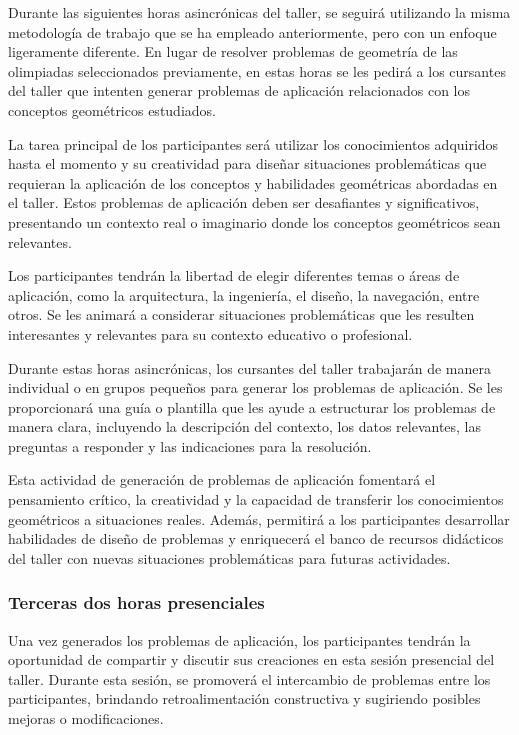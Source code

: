 Durante las siguientes horas asincrónicas del taller, se seguirá utilizando la misma metodología de trabajo que se ha empleado anteriormente, pero con un enfoque ligeramente diferente. En lugar de resolver problemas de geometría de las olimpiadas seleccionados previamente, en estas horas se les pedirá a los cursantes del taller que intenten generar problemas de aplicación relacionados con los conceptos geométricos estudiados.

La tarea principal de los participantes será utilizar los conocimientos adquiridos hasta el momento y su creatividad para diseñar situaciones problemáticas que requieran la aplicación de los conceptos y habilidades geométricas abordadas en el taller. Estos problemas de aplicación deben ser desafiantes y significativos, presentando un contexto real o imaginario donde los conceptos geométricos sean relevantes.

Los participantes tendrán la libertad de elegir diferentes temas o áreas de aplicación, como la arquitectura, la ingeniería, el diseño, la navegación, entre otros. Se les animará a considerar situaciones problemáticas que les resulten interesantes y relevantes para su contexto educativo o profesional.

Durante estas horas asincrónicas, los cursantes del taller trabajarán de manera individual o en grupos pequeños para generar los problemas de aplicación. Se les proporcionará una guía o plantilla que les ayude a estructurar los problemas de manera clara, incluyendo la descripción del contexto, los datos relevantes, las preguntas a responder y las indicaciones para la resolución.

Esta actividad de generación de problemas de aplicación fomentará el pensamiento crítico, la creatividad y la capacidad de transferir los conocimientos geométricos a situaciones reales. Además, permitirá a los participantes desarrollar habilidades de diseño de problemas y enriquecerá el banco de recursos didácticos del taller con nuevas situaciones problemáticas para futuras actividades.

\subsubsection{Terceras dos horas presenciales}

Una vez generados los problemas de aplicación, los participantes tendrán la oportunidad de compartir y discutir sus creaciones en esta sesión presencial del taller. Durante esta sesión, se promoverá el intercambio de problemas entre los participantes, brindando retroalimentación constructiva y sugiriendo posibles mejoras o modificaciones.

